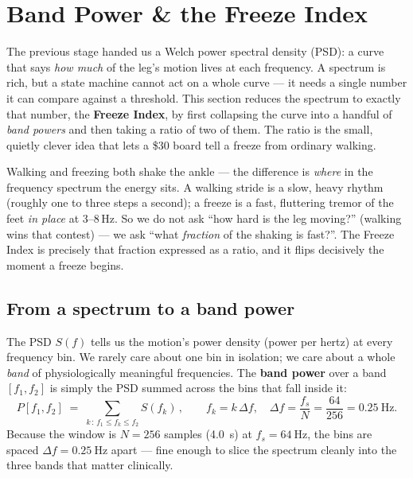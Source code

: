 \section{Band Power \& the Freeze Index}
\label{sec:freeze-index}

The previous stage handed us a Welch power spectral density (PSD): a curve that
says \emph{how much} of the leg's motion lives at each frequency. A spectrum is rich,
but a state machine cannot act on a whole curve --- it needs a single number it can
compare against a threshold. This section reduces the spectrum to exactly that number,
the \textbf{Freeze Index}, by first collapsing the curve into a handful of
\emph{band powers} and then taking a ratio of two of them. The ratio is the small,
quietly clever idea that lets a \$30 board tell a freeze from ordinary walking.

\begin{intuition}
Walking and freezing both shake the ankle --- the difference is \emph{where} in the
frequency spectrum the energy sits. A walking stride is a slow, heavy rhythm
(roughly one to three steps a second); a freeze is a fast, fluttering tremor of the
feet \emph{in place} at 3--8\,Hz. So we do not ask ``how hard is the leg moving?''
(walking wins that contest) --- we ask ``what \emph{fraction} of the shaking is fast?''.
The Freeze Index is precisely that fraction expressed as a ratio, and it flips
decisively the moment a freeze begins.
\end{intuition}

\subsection{From a spectrum to a band power}

The PSD $S(f)$ tells us the motion's power density (power per hertz) at every
frequency bin. We rarely care about one bin in isolation; we care about a whole
\emph{band} of physiologically meaningful frequencies. The \textbf{band power} over a
band $[f_1,f_2]$ is simply the PSD summed across the bins that fall inside it:
%
\begin{equation}
P[f_1,f_2] \;=\; \sum_{k\,:\, f_1 \le f_k \le f_2} S(f_k)\,,
\qquad f_k = k\,\Delta f,\quad \Delta f = \frac{f_s}{N} = \frac{64}{256}=\SI{0.25}{\hertz}.
\label{eq:bandpower}
\end{equation}
%
Because the window is $N=256$ samples (\SI{4.0}{\second}) at $f_s = \SI{64}{\hertz}$,
the bins are spaced $\Delta f = \SI{0.25}{\hertz}$ apart --- fine enough to slice the
spectrum cleanly into the three bands that matter clinically.

